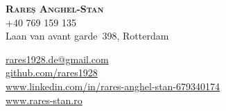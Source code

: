 \documentclass[a4paper, 11pt]{article}
\begin{document}
\begin{comment}
In Europe it is common to include a picture of ones self in the CV. Select
which heading appropriate for the document you are creating.
\end{comment}


\begin{minipage}[c]{0.4\textwidth}
	\textbf{\LARGE \scshape{Rareș Anghel-Stan}} \\ \vspace{1pt} 
	+40 769 159 135\\
	Laan van avant garde 398, Rotterdam\\
\hfill\vline\hfill
\end{minipage}
\begin{minipage}[c]{0.5\textwidth}
    \href{mailto:rares1928.de@gmail.com}{rares1928.de@gmail.com}\\
    \href{https://github.com/rares1928}{github.com/rares1928} \\
    \href{https://www.linkedin.com/in/rares-anghel-stan-679340174/}{www.linkedin.com/in/rares-anghel-stan-679340174} \\
    \href{https://www.rares-stan.ro/}{www.rares-stan.ro}
\end{minipage}

\end{document}
